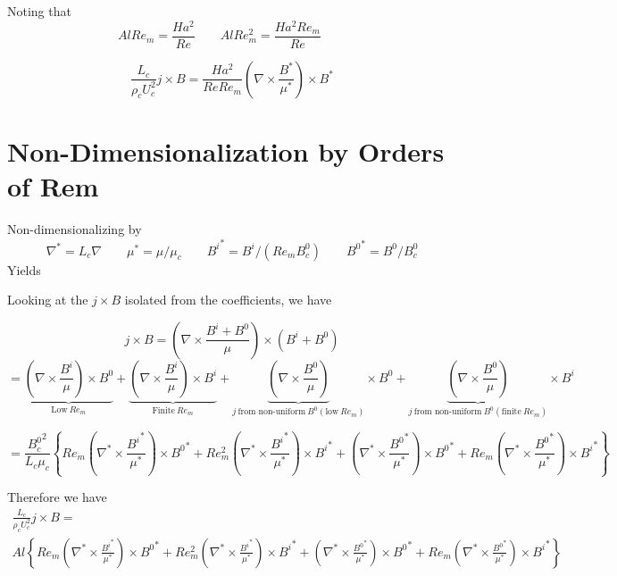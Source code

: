 \documentclass[11pt]{article}
\begin{document}
Noting that
\begin{equation}
	Al Re_m = \frac{Ha^2}{Re} \qquad
	Al Re_m^2 = \frac{Ha^2 Re_m}{Re} \qquad
\end{equation}

\begin{equation}
	\boxed{
	 \frac{L_c}{\rho_c U_c^2} j \times B
	 =
	\frac{Ha^2}{Re Re_m} \left( \nabla \times \frac{B^*}{\mu^*} \right) \times B^*
	}
\end{equation}

\section{Non-Dimensionalization by Orders of Rem}
Non-dimensionalizing by
\begin{equation}
	\nabla^* = L_c \nabla \qquad
	\mu^* = \mu / \mu_c \qquad
	{B^{i}}^* = B^{i}/(Re_m B_c^0) \qquad
	{B^0}^* = B^0/B_c^0
\end{equation}
Yields

Looking at the $j \times B$ isolated from the coefficients, we have

\begin{equation}
	j \times B
	=
	\left( \nabla \times \frac{B^{i}+B^0}{\mu} \right) \times (B^{i}+B^0)
\end{equation}
\begin{equation}
	=
	\underbrace{\left( \nabla \times \frac{B^{i}}{\mu} \right) \times B^0}_{\text{Low}\ Re_m}
	+
	\underbrace{\left( \nabla \times \frac{B^{i}}{\mu} \right) \times B^{i}}_{\text{Finite}\ Re_m}
	+
	\underbrace{\left( \nabla \times \frac{B^0}{\mu} \right)}_{j\ \text{from non-uniform}\ B^0 (\text{low}\ Re_m)} \times B^0
	+
	\underbrace{\left( \nabla \times \frac{B^0}{\mu} \right)}_{j\ \text{from non-uniform}\ B^0 (\text{finite}\ Re_m)} \times B^{i}
\end{equation}

\begin{equation}
	=
	\frac{{B_c^0}^2}{L_c \mu_c}
	\left\{
	Re_m \left( \nabla^* \times \frac{{B^{i}}^*}{\mu^*} \right) \times {B^0}^*
	+
	Re_m^2 \left( \nabla^* \times \frac{{B^{i}}^*}{\mu^*} \right) \times {B^{i}}^*
	+
	\left( \nabla^* \times \frac{{B^0}^*}{\mu^*} \right) \times {B^0}^*
	+
	Re_m \left( \nabla^* \times \frac{{B^0}^*}{\mu^*} \right) \times {B^{i}}^*
	\right\}
\end{equation}

Therefore we have
\begin{multline}
	 \frac{L_c}{\rho_c U_c^2} j \times B
	 = \\
	 Al
	\left\{
	Re_m \left( \nabla^* \times \frac{{B^{i}}^*}{\mu^*} \right) \times {B^0}^*
	+
	Re_m^2 \left( \nabla^* \times \frac{{B^{i}}^*}{\mu^*} \right) \times {B^{i}}^*
	+
	\left( \nabla^* \times \frac{{B^0}^*}{\mu^*} \right) \times {B^0}^*
	+
	Re_m \left( \nabla^* \times \frac{{B^0}^*}{\mu^*} \right) \times {B^{i}}^*
	\right\}
\end{multline}
\end{document}
